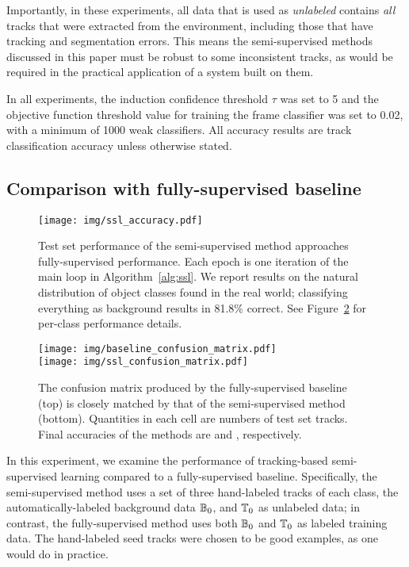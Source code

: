 \documentclass[conference]{IEEEtran}
\begin{document}
Importantly, in these experiments, all data that is used as \textit{unlabeled} contains \textit{all} tracks that were extracted from the environment, including those that have tracking and segmentation errors.  This means the semi-supervised methods discussed in this paper must be robust to some inconsistent tracks, as would be required in the practical application of a system built on them.

In all experiments, the induction confidence threshold $\tau$ was set to 5 and the objective function threshold value for training the frame classifier was set to 0.02, with a minimum of 1000 weak classifiers.  All accuracy results are track classification accuracy unless otherwise stated.

\subsection{Comparison with fully-supervised baseline}
\label{sec:core}

\begin{figure}
  \centering
  \texttt{[image: img/ssl\_accuracy.pdf]}
  \caption{Test set performance of the semi-supervised method approaches fully-supervised performance.  Each epoch is one iteration of the main loop in Algorithm~\ref{alg:ssl}.  We report results on the natural distribution of object classes found in the real world; classifying everything as background results in 81.8\% correct.  See Figure~\ref{fig:conf} for per-class performance details.}
  \label{fig:core}
\end{figure}

\begin{figure}
  \centering
  \texttt{[image: img/baseline\_confusion\_matrix.pdf]} \\
  \vspace{0.1in}
  \texttt{[image: img/ssl\_confusion\_matrix.pdf]}
  \caption{The confusion matrix produced by the fully-supervised baseline (top) is closely matched by that of the semi-supervised method (bottom).  Quantities in each cell are numbers of test set tracks.  Final accuracies of the methods are \protect and \protect, respectively.}
  \label{fig:conf}
\end{figure}

In this experiment, we examine the performance of tracking-based semi-supervised learning compared to a fully-supervised baseline.  Specifically, the semi-supervised method uses a set of three hand-labeled tracks of each class, the automatically-labeled background data $\mathbb{B}_0$, and $\mathbb{T}_0$ as unlabeled data; in contrast, the fully-supervised method uses both $\mathbb{B}_0$ and $\mathbb{T}_0$ as labeled training data.  The hand-labeled seed tracks were chosen to be good examples, as one would do in practice.
\end{document}
